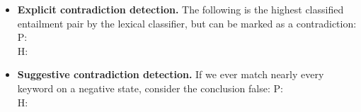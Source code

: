 \begin{itemize}
\item \textbf{Explicit contradiction detection.} 
      The following is the highest classified
      entailment pair by the lexical classifier, but can be marked as a 
      contradiction: \\
  P:  \\
  H: 

\item \textbf{Suggestive contradiction detection.} 
      If we ever match nearly every keyword on a negative state, consider the conclusion
      false:
  P:  \\
  H: 
\end{itemize}

\newpage
